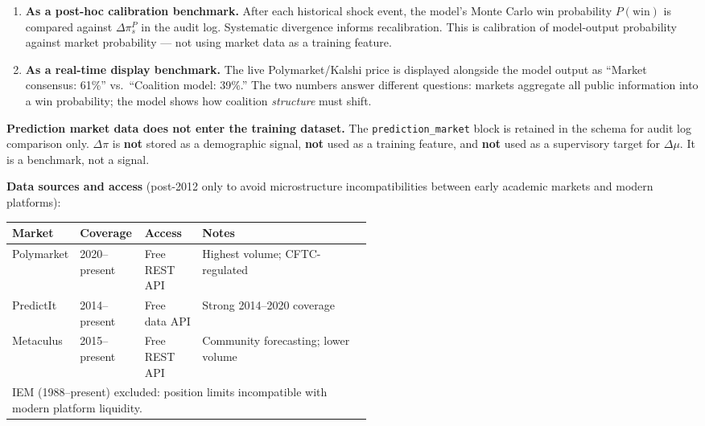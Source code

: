 \documentclass[11pt]{article}
\begin{document}
\begin{enumerate}[leftmargin=2em, itemsep=3pt]
  \item \textbf{As a post-hoc calibration benchmark.} After each historical shock
        event, the model's Monte Carlo win probability $P(\text{win})$ is compared
        against $\Delta\pi^{P}_{s}$ in the audit log. Systematic divergence
        informs recalibration. This is calibration of model-output probability
        against market probability --- not using market data as a training feature.

  \item \textbf{As a real-time display benchmark.} The live Polymarket/Kalshi price
        is displayed alongside the model output as ``Market consensus: 61\%''
        vs.\ ``Coalition model: 39\%.'' The two numbers answer different questions:
        markets aggregate all public information into a win probability;
        the model shows how coalition \emph{structure} must shift.
\end{enumerate}

\noindent\textbf{Prediction market data does not enter the training dataset.}
The \texttt{prediction\_market} block is retained in the schema for audit log
comparison only. $\Delta\pi$ is \textbf{not} stored as a demographic signal,
\textbf{not} used as a training feature, and \textbf{not} used as a supervisory
target for $\Delta\mu$. It is a benchmark, not a signal.

\textbf{Data sources and access} (post-2012 only to avoid microstructure
incompatibilities between early academic markets and modern platforms):

\begin{center}
\begin{tabularx}{\linewidth}{p{0.18\linewidth}p{0.18\linewidth}p{0.16\linewidth}X}
\toprule
\textbf{Market} & \textbf{Coverage} & \textbf{Access} & \textbf{Notes} \\
\midrule
Polymarket & 2020--present & Free REST API & Highest volume; CFTC-regulated \\
PredictIt & 2014--present & Free data API & Strong 2014--2020 coverage \\
Metaculus & 2015--present & Free REST API & Community forecasting; lower volume \\
\bottomrule
\multicolumn{4}{l}{\small IEM (1988--present) excluded: position limits incompatible with modern platform liquidity.} \\
\end{tabularx}
\end{center}
\end{document}
